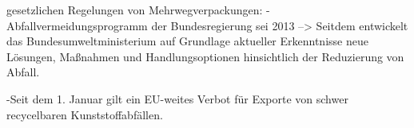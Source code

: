 gesetzlichen Regelungen von Mehrwegverpackungen:
-Abfallvermeidungsprogramm der Bundesregierung sei 2013
--> Seitdem entwickelt das Bundesumweltministerium auf Grundlage aktueller Erkenntnisse neue Lösungen, Maßnahmen und Handlungsoptionen hinsichtlich der Reduzierung von Abfall.

-Seit dem 1. Januar gilt ein EU-weites Verbot für Exporte von schwer recycelbaren Kunststoffabfällen.























